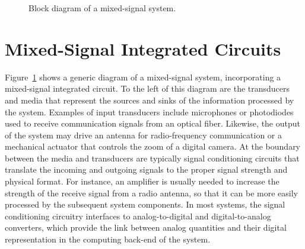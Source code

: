 \documentclass[
  11pt,
  letterpaper,
  abstract]{scrbook}
\begin{document}
\begin{figure}


\caption{\label{fig-1.1}Block diagram of a mixed-signal system.}

\end{figure}%

\section{Mixed-Signal Integrated
Circuits}\label{mixed-signal-integrated-circuits}

Figure~\ref{fig-1.1} shows a generic diagram of a mixed-signal system,
incorporating a mixed-signal integrated circuit. To the left of this
diagram are the transducers and media that represent the sources and
sinks of the information processed by the system. Examples of input
transducers include microphones or photodiodes used to receive
communication signals from an optical fiber. Likewise, the output of the
system may drive an antenna for radio-frequency communication or a
mechanical actuator that controls the zoom of a digital camera. At the
boundary between the media and transducers are typically signal
conditioning circuits that translate the incoming and outgoing signals
to the proper signal strength and physical format. For instance, an
amplifier is usually needed to increase the strength of the receive
signal from a radio antenna, so that it can be more easily processed by
the subsequent system components. In most systems, the signal
conditioning circuitry interfaces to analog-to-digital and
digital-to-analog converters, which provide the link between analog
quantities and their digital representation in the computing back-end of
the system.
\end{document}
